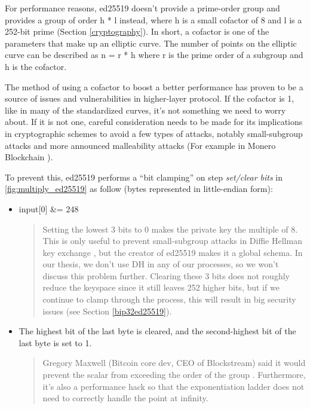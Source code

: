 \begin{adjustwidth}{1cm}{}
    For performance reasons, ed25519 doesn't provide a prime-order group and provides a group of order h * l instead, where h is a small cofactor of 8 and l is a 252-bit prime (Section \ref{cryptography}). In short, a cofactor is one of the parameters that make up an elliptic curve. The number of points on the elliptic curve can be described as n = r * h where r is the prime order of a subgroup and h is the cofactor.

    The method of using a cofactor to boost a better performance \cite{DBLP:journals/iacr/BernsteinL17} has proven to be a source of issues and vulnerabilities in higher-layer protocol. If the cofactor is 1, like in many of the standardized curves, it’s not something we need to worry about. If it is not one, careful consideration needs to be made for its implications in cryptographic schemes to avoid a few types of attacks, notably small-subgroup attacks \cite{DBLP:journals/rfc/rfc2785} and more announced malleability attacks (For example in Monero Blockchain \cite{Riccardo}).

    To prevent this, ed25519 performs a “bit clamping” on step \textit{set/clear bits} in \autoref{fig:multiply_ed25519} as follow (bytes represented in little-endian form):

    \begin{itemize}
        \item input[0] \&= 248
              \begin{quote}
                  Setting the lowest 3 bits to 0 makes the private key the multiple of 8. This is only useful to prevent small-subgroup attacks in Diffie Hellman key exchange \cite{enwiki:1057850165}, but the creator of ed25519 makes it a global schema. In our thesis, we don't use DH in any of our processes, so we won't discuss this problem further. Clearing these 3 bits does not roughly reduce the keyspace since it still leaves 252 higher bits, but if we continue to clamp through the process, this will result in big security issues (see Section \ref{bip32ed25519}).

              \end{quote}

              \bigskip

        \item The highest bit of the last byte is cleared, and the second-highest bit of the last byte is set to 1.
              \begin{quote}

                  Gregory Maxwell (Bitcoin core dev, CEO of Blockstream) said it would prevent the scalar from exceeding the order of the group \cite{mail:000860}. Furthermore, it's also a performance hack so that the exponentiation ladder does not need to correctly handle the point at infinity.


\end{quote}
\end{itemize}
\end{adjustwidth}
